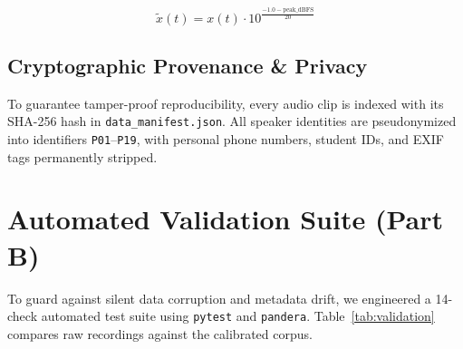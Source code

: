 \documentclass[sigconf,authordraft]{acmart}
\begin{document}
\begin{equation}
  \tilde{x}(t) = x(t) \cdot 10^{\frac{-1.0 - \text{peak\_dBFS}}{20}}
  \label{eq:norm}
\end{equation}

\subsection{Cryptographic Provenance \& Privacy}

To guarantee tamper-proof reproducibility, every audio clip is indexed with its SHA-256
hash in \texttt{data\_manifest.json}. All speaker identities are pseudonymized into identifiers
\texttt{P01}--\texttt{P19}, with personal phone numbers, student IDs, and EXIF tags permanently stripped.

\section{Automated Validation Suite (Part B)}
\label{sec:validation}

To guard against silent data corruption and metadata drift, we engineered a 14-check
automated test suite using \texttt{pytest} and \texttt{pandera}. Table~\ref{tab:validation}
compares raw recordings against the calibrated corpus.
\end{document}
